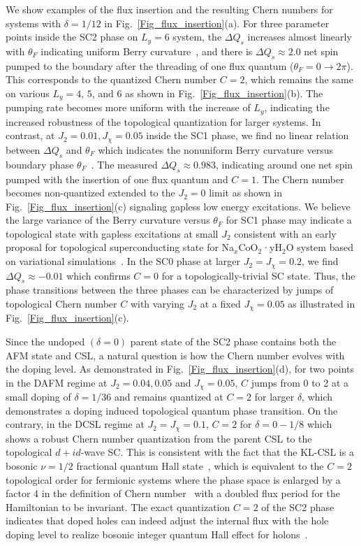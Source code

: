 \documentclass[aps,prx,reprint,superscriptaddress,showpacs]{revtex4-2}
\begin{document}
We show examples of the flux insertion and the resulting Chern numbers for systems with $\delta=1/12$ in Fig.~\ref{Fig_flux_insertion}(a). For three parameter points inside the SC2 phase on $L_{y}=6$ system, the $\Delta Q_{s}$ increases almost linearly with $\theta _{F}$ indicating uniform Berry curvature~\cite{sheng2006}, and there is $\Delta Q_{s}\approx 2.0$ net spin  pumped to  the boundary after the threading of one flux quantum ($\theta_F=0\rightarrow 2\pi$). This corresponds to the quantized Chern number $C=2$, which remains the same on various $L_{y}=4$, $5$, and $6$ as shown in Fig.~\ref{Fig_flux_insertion}(b). The pumping rate becomes more uniform with the increase of $L_{y}$, indicating the increased robustness of the topological quantization for larger systems.   In contrast, at $J_{2}=0.01,J_{\chi}=0.05$ inside the SC1 phase, we find no linear relation between $\Delta Q_{s}$ and $\theta _{F}$ which indicates the nonuniform Berry curvature versus boundary phase $\theta_F$~\cite{sheng2006}. The measured $\Delta Q_{s}\approx 0.983$, indicating around one  net spin  pumped  with the insertion of one flux quantum and $C = 1$. The Chern number becomes non-quantized extended to the $J_{2}=0$ limit  as shown in Fig.~\ref{Fig_flux_insertion}(c) signaling gapless low energy excitations. We believe the large  variance of the Berry curvature versus $\theta_F$ for SC1 phase may indicate a  topological state with gapless excitations at small $J_{2}$ consistent with an early proposal for
topological superconducting state for Na$_x$CoO$_2$·yH$_2$O system based on variational simulations~\cite{zhou2008nodal}. In the SC0 phase at larger $J_{2}=J_{\chi }=0.2$, we find $\Delta Q_{s}\approx -0.01$ which confirms $C = 0$ for a topologically-trivial SC state. Thus, the phase transitions between the three phases can be characterized by jumps of topological Chern number $C$ with varying $J_{2}$ at a fixed $J_{\chi}=0.05$ as illustrated in Fig.~\ref{Fig_flux_insertion}(c). 

Since the undoped $(\delta=0)$ parent state of the SC2 phase contains both the AFM state and  CSL, a natural question is how the Chern number evolves with the doping level. As demonstrated in Fig.~\ref{Fig_flux_insertion}(d), for two points in the DAFM regime at $J_{2}=0.04,0.05$ and $J_{\chi}=0.05$, $C$ jumps from 0 to 2 at  a small doping of $\delta=1/36$ and remains quantized at $C=2$ for larger $\delta$, which demonstrates a doping induced topological quantum phase transition. On the contrary, in the DCSL regime at $J_{2}=J_{\chi}=0.1$, $C=2$ for $\delta=0-1/8$ which shows a robust Chern number quantization from the parent CSL to the topological $d+id$-wave SC. This is consistent with the fact that the KL-CSL is a bosonic $\nu =1/2$  fractional quantum Hall  state~\cite{kalmeyer1987equivalence,wen1989chiral,read2000paired}, which is equivalent to the $C=2$ topological order for fermionic systems where the phase space is enlarged by a factor 4 in the definition of Chern number~\cite{hu2015variational} with a doubled flux period  for the Hamiltonian to be invariant. The exact quantization $C=2$ of the SC2 phase indicates that doped holes can indeed adjust the internal flux with the hole doping level to realize bosonic integer quantum Hall effect for holons~\cite{song2021doping}. 
\end{document}
